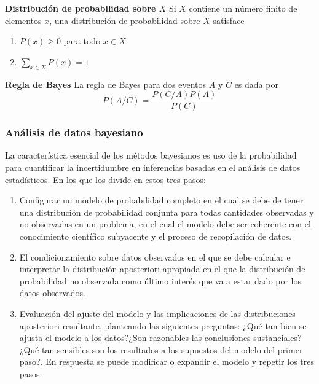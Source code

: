 \begin{defi}
    \textbf{Distribución de probabilidad sobre $X$} \cite{koski2011bayesian}
    Si $X$ contiene un número finito de elementos $x$, una distribución de probabilidad sobre $X$ satisface
    \begin{enumerate}
        \item $P(x) \geq 0$ para todo $x \in X$
        \item $\sum\limits_{x \in X}^{}P(x) = 1$
    \end{enumerate}
\end{defi}

\begin{defi}
    \textbf{Regla de Bayes} \cite{koski2011bayesian}
    La regla de Bayes para dos eventos $A$ y $C$ es dada por
    $$P(A/C) = \frac{P(C/A)P(A)}{P(C)}$$
\end{defi}

\subsubsection{Análisis de datos bayesiano}
La característica esencial de los métodos bayesianos es uso de la probabilidad para cuantificar la incertidumbre en inferencias basadas en el análisis de datos estadísticos. En los que \cite{gelman1995bayesian} los divide en estos tres pasos:
\begin{enumerate}
    \item Configurar un modelo de probabilidad completo en el cual se debe de tener una distribución de probabilidad conjunta para todas cantidades observadas y no observadas en un problema, en el cual el modelo debe ser coherente con el conocimiento científico subyacente y el proceso de recopilación de datos.
    \item El condicionamiento sobre datos observados en el que se debe calcular e interpretar la distribución aposteriori apropiada en el que la distribución de probabilidad no observada como último interés que va a estar dado por los datos observados.
    \item Evaluación del ajuste del modelo y las implicaciones de las distribuciones aposteriori resultante, planteando las siguientes preguntas: ¿Qué tan bien se ajusta el modelo a los datos?¿Son razonables las conclusiones sustanciales?¿Qué tan sensibles son los resultados a los supuestos del modelo del primer paso?. En respuesta se puede modificar o expandir el modelo y repetir los tres pasos.
\end{enumerate}

